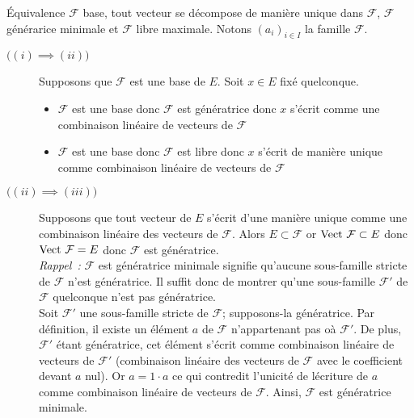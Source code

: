 \documentclass{article}
\begin{document}
{Équivalence $\mathcal{F}$ base, tout vecteur se décompose de manière unique dans $\mathcal{F}$, $\mathcal{F}$ générarice minimale et $\mathcal{F}$ libre maximale.}
	Notons $(a_{i})_{i\in I}$ la famille $\mathcal{F}$.
	\begin{description}
		\item[$\bigl((i) \implies (ii)\bigr)$] Supposons que $\mathcal{F}$ est une base de $E$. Soit $x\in E$ fixé quelconque.
		      \begin{itemize}
			      \item $\mathcal{F}$ est une base donc $\mathcal{F}$ est génératrice donc $x$ s’écrit comme une combinaison linéaire de vecteurs de $\mathcal{F}$
			      \item $\mathcal{F}$ est une base donc $\mathcal{F}$ est libre donc $x$ s’écrit de manière unique comme combinaison linéaire de vecteurs de $\mathcal{F}$
		      \end{itemize}

		\item[$\bigl((ii) \implies (iii)\bigr)$] Supposons que tout vecteur de $E$ s’écrit d’une manière unique comme une combinaison linéaire des vecteurs de $\mathcal{F}$. Alors $E\subset \mathcal{F}$ or $\text{Vect } \mathcal{F}\subset E$ donc $\text{Vect } \mathcal{F} = E$ donc $\mathcal F$ est génératrice.\\[4pt]
		      \quad \textit{Rappel~:} $\mathcal{F}$ est génératrice minimale signifie qu’aucune sous-famille stricte de $\mathcal{F}$ n’est génératrice. Il suffit donc de montrer qu’une sous-famille $\mathcal{F}'$ de $\mathcal{F}$ quelconque n’est pas génératrice.\\[4pt]
		      Soit $\mathcal{F'}$ une sous-famille stricte de $\mathcal{F}$; supposons-la génératrice. Par définition, il existe un élément $a$ de $\mathcal{F}$ n’appartenant pas oà $\mathcal{F'}$. De plus, $\mathcal{F'}$ étant génératrice, cet élément s’écrit comme combinaison linéaire de vecteurs de $\mathcal{F'}$ (combinaison linéaire des vecteurs de $\mathcal{F}$ avec le coefficient devant $a$ nul). Or $a=1 \cdot a$ ce qui contredit l’unicité de lécriture de $a$ comme combinaison linéaire de vecteurs de $\mathcal{F}$. Ainsi, $\mathcal{F}$ est génératrice minimale.


\end{description}
\end{question_kholle}
\end{document}
